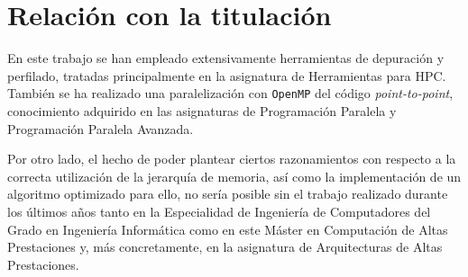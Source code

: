 \section{Relación con la titulación}
En este trabajo se han empleado extensivamente herramientas de depuración y perfilado, tratadas principalmente en la asignatura de Herramientas para HPC. También se ha realizado una paralelización con \texttt{OpenMP} del código \textit{point-to-point}, conocimiento adquirido en las asignaturas de Programación Paralela y Programación Paralela Avanzada.

Por otro lado, el hecho de poder plantear ciertos razonamientos con respecto a la correcta utilización de la jerarquía de memoria, así como la implementación de un algoritmo optimizado para ello, no sería posible sin el trabajo realizado durante los últimos años tanto en la Especialidad de Ingeniería de Computadores del Grado en Ingeniería Informática como en este Máster en Computación de Altas Prestaciones y, más concretamente, en la asignatura de Arquitecturas de Altas Prestaciones.

